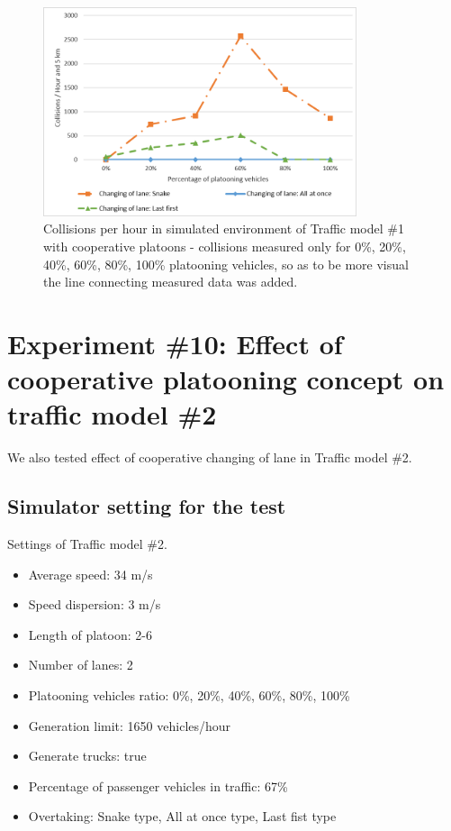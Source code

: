 \begin{figure}[!htbp]
\centering
\includegraphics[width=0.82\textwidth,height=0.82\textheight,keepaspectratio]{figures/Chapter_6/6_E3_collision.png}
\centering
\protect\caption[Collisions per hour in simulated environment  of Traffic model \#1 with cooperative platoons]{\label{fig:6_4_2-2}Collisions per hour in simulated environment  of Traffic model \#1 with cooperative platoons - collisions measured only for 0\%, 20\%, 40\%, 60\%, 80\%, 100\% platooning vehicles, so as to be more visual the line connecting measured data was added.}
\end{figure}







\newpage
\section[Experiment \#10: Effect of cooperative platooning concept on traffic model \#2]{Experiment \#10: Effect of cooperative platooning concept on traffic model \#2 }

We also tested effect of cooperative changing of lane in Traffic model \#2.

\subsection*{Simulator setting for the test}
Settings of Traffic model \#2.
\begin{itemize}
\item Average speed: 34 m/s
\item Speed dispersion: 3 m/s
\item Length of platoon: 2-6
\item Number of lanes:  2
\item Platooning vehicles ratio: 0\%, 20\%, 40\%, 60\%, 80\%, 100\%
\item Generation limit: 1650 vehicles/hour
\item Generate trucks: true
\item Percentage of passenger vehicles in traffic: 67\%
\item Overtaking: Snake type, All at once type, Last fist type
\end{itemize}


